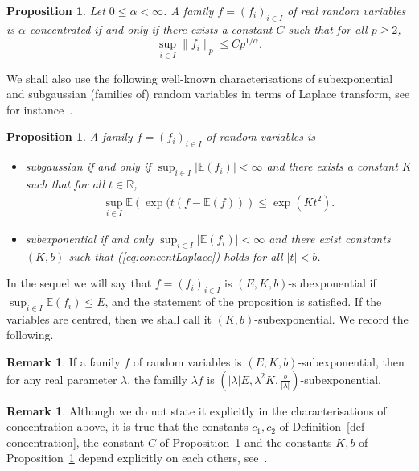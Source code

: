 \documentclass[11pt,leqno]{article}
\theoremstyle{plain}
\newtheorem{proposition}[theorem]{Proposition}
\theoremstyle{definition}
\newtheorem{remark}[theorem]{Remark}
\theoremstyle{remark}
\numberwithin{equation}{section}
\newcommand{\E}{\mathbb{E}}
\begin{document}
\begin{proposition}\label{prop:p-ConcentrationInequalities} Let
$0\leq\alpha<\infty$. A family $f=(f_{i})_{i\in I}$ of real random variables is $\alpha$-concentrated if and only if 
 there exists a constant $C$ such that for all $p\geq2$, 
\[
\sup_{i\in I}\|f_{i}\|_{p}\leq Cp^{1/\alpha}.
\]
\end{proposition}

We shall also use the following well-known characterisations of
subexponential and subgaussian (families of) random variables in terms
of Laplace transform, see for instance~\cite[Propositions 2.5.2 and 2.7.1]{Vershynin}.

\begin{proposition}\label{prop:SubexpSubGauss} A family $f=(f_{i})_{i\in I}$
of random variables is 
\begin{itemize}
\item subgaussian if and only if $\sup_{i\in I}|\E(f_{i})|<\infty$ and there exists a constant $K$ such that for all $t \in \mathbb{R}$,
\begin{align}\label{eq:concentLaplace}
\sup_{i\in I}\E\left(\exp(t(f-\E(f))\right)\leq\exp(Kt^{2}).
\end{align}
\item subexponential  if and
only $\sup_{i\in I}|\E(f_{i})|<\infty$ and there exist constants
$(K,b)$  such that (\ref{eq:concentLaplace}) holds  for all $|t|<b$.
\end{itemize}
\end{proposition} 

In the sequel we will say that $f=(f_{i})_{i\in I}$ is $(E,K,b)$-subexponential
if $\sup_{i\in I}\E(f_{i})\leq E$, and the statement of the proposition
is satisfied. If the variables are centred, then we shall call it
$(K,b)$-subexponential. We record the following. 

\begin{remark}\label{rk:lambda}
If a family $f$ of random variables is $(E,K,b)$-subexponential, then for any real parameter $\lambda$, the familly $\lambda f$ is $(|\lambda| E, \lambda^2 K, \frac{b}{|\lambda|})$-subexponential.
\end{remark}

\begin{remark}
Although we do not state it explicitly in the characterisations of concentration above, it is true that the constants $c_1,c_2$ of Definition~\ref{def-concentration}, the constant $C$ of Proposition~\ref{prop:p-ConcentrationInequalities} and the constants $K,b$ of Proposition~\ref{prop:SubexpSubGauss} depend explicitly on each others, see~\cite{Pisier,Vershynin}.
\end{remark}
\end{document}
